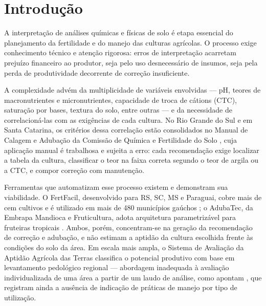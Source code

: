 
\chapter{Introdução}\label{chap:introducao}

A interpretação de análises químicas e físicas de solo é etapa essencial do
planejamento da fertilidade e do manejo das culturas agrícolas. O processo exige
conhecimento técnico e atenção rigorosa: erros de interpretação acarretam prejuízo
financeiro ao produtor, seja pelo uso desnecessário de insumos, seja pela perda de
produtividade decorrente de correção insuficiente.

A complexidade advém da multiplicidade de variáveis envolvidas --- pH, teores de
macronutrientes e micronutrientes, capacidade de troca de cátions (CTC), saturação por
bases, textura do solo, entre outras \citep{Embrapa2011, ManualCalagem2016} --- e da
necessidade de correlacioná-las com as exigências de cada cultura. No Rio Grande do Sul
e em Santa Catarina, os critérios dessa correlação estão consolidados no Manual de
Calagem e Adubação da Comissão de Química e Fertilidade do Solo
\citep{ManualCalagem2016}, cuja aplicação manual é trabalhosa e sujeita a erro: cada
recomendação exige localizar a tabela da cultura, classificar o teor na faixa correta
segundo o teor de argila ou a CTC, e compor correção com manutenção.

Ferramentas que automatizam esse processo existem e demonstram sua viabilidade. O
FertFacil, desenvolvido para RS, SC, MS e Paraguai, cobre mais de cem cultivos e é
utilizado em mais de 480 municípios gaúchos \citep{Tiecher2016}; o AdubaTec, da Embrapa
Mandioca e Fruticultura, adota arquitetura parametrizável para fruteiras tropicais
\citep{AdubaTec2021}. Ambos, porém, concentram-se na geração da recomendação de correção
e adubação, e não estimam a aptidão da cultura escolhida frente às condições do solo da
área. Em escala mais ampla, o Sistema de Avaliação da Aptidão Agrícola das Terras
\citep{EmbrapaAptidao2025} classifica o potencial produtivo com base em levantamento
pedológico regional --- abordagem inadequada à avaliação individualizada de uma área a
partir de um laudo de análise, como apontam \cite{Hofig2015}, que registram ainda a
ausência de indicação de práticas de manejo por tipo de utilização.

